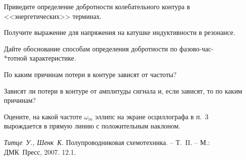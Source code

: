 \begin{lab:questions}

    \item   Приведите определение добротности колебательного контура в <<энергетических>> терминах.

    \item  Получите выражение для напряжения на катушке индуктивности  в резонансе.

    \item Дайте обоснование способам определения добротности по фазово-час-\\*тотной характеристике.

    \item По каким причинам потери в контуре зависят от частоты?

    \item * Зависят ли потери в контуре от амплитуды сигнала и, если зависят, то по каким причинам?

    \item * Оцените, на какой частоте $\omega_m$ эллипс на экране осциллографа в п.~3 вырождается в прямую линию с положительным наклоном.
\end{lab:questions}

\begin{lab:literature}
    \item \emph{Титце~У., Шенк~К.} Полупроводниковая схемотехника.  – Т.~II. – М.: ДМК~Пресс, 2007. 12.1.
\end{lab:literature}